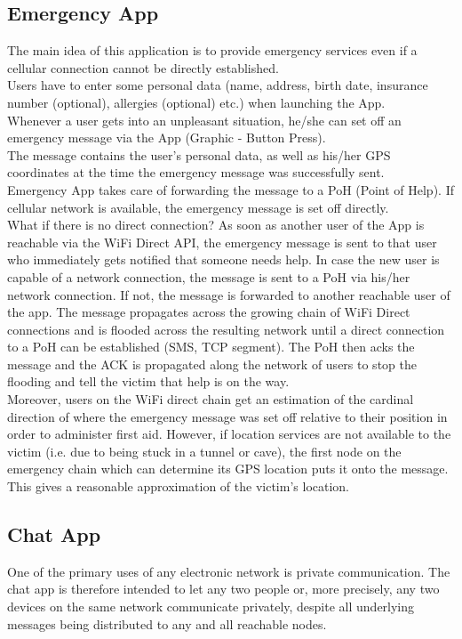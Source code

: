 \subsection{Emergency App}
The main idea of this application is to provide emergency services even if a cellular connection cannot be directly established. \\
Users have to enter some personal data (name, address, birth date, insurance number (optional), allergies (optional) etc.) when launching the App. \\
Whenever a user gets into an unpleasant situation, he/she can set off an emergency message via the App (Graphic - Button Press). \\
The message contains the user's personal data, as well as his/her GPS coordinates at the time the emergency message was successfully sent. \\
Emergency App takes care of forwarding the message to a PoH (Point of Help). If cellular network is available, the emergency message is set off directly. \\
What if there is no direct connection? As soon as another user of the App is reachable via the WiFi Direct API, the emergency message is sent to that user who immediately gets notified that someone needs help. In case the new user is capable of a network connection, the message is sent to a PoH via his/her network connection. If not, the message is forwarded to another reachable user of the app. The message propagates across the growing chain of WiFi Direct connections and is flooded across the resulting network until a direct connection to a PoH can be established (SMS, TCP segment). The PoH then acks the message and the ACK is propagated along the network of users to stop the flooding and tell the victim that help is on the way. \\
Moreover, users on the WiFi direct chain get an estimation of the cardinal direction of where the emergency message was set off relative to their position in order to administer first aid.
However, if location services are not available to the victim (i.e. due to being stuck in a tunnel or cave), the first node on the emergency chain which can determine its GPS location puts it onto the message. This gives a reasonable approximation of the victim's location. \\
		
\subsection{Chat App}
One of the primary uses of any electronic network is private communication. The chat app is therefore intended to let any two people or, more precisely, any two devices on the same network communicate privately, despite all underlying messages being distributed to any and all reachable nodes.

